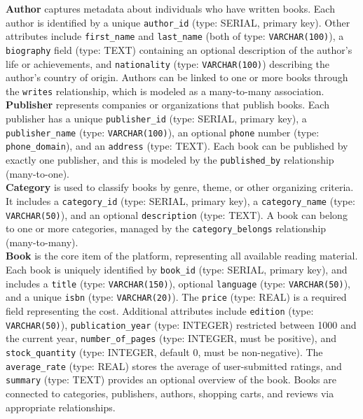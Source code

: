 \textbf{Author} captures metadata about individuals who have written books. Each author is identified by a unique \texttt{author\_id} (type: SERIAL, primary key). Other attributes include \texttt{first\_name} and \texttt{last\_name} (both of type: \texttt{VARCHAR(100)}), a \texttt{biography} field (type: TEXT) containing an optional description of the author's life or achievements, and \texttt{nationality} (type: \texttt{VARCHAR(100)}) describing the author’s country of origin. Authors can be linked to one or more books through the \texttt{writes} relationship, which is modeled as a many-to-many association.\\

\textbf{Publisher} represents companies or organizations that publish books. Each publisher has a unique \texttt{publisher\_id} (type: SERIAL, primary key), a \texttt{publisher\_name} (type: \texttt{VARCHAR(100)}), an optional \texttt{phone} number (type: \texttt{phone\_domain}), and an \texttt{address} (type: TEXT). Each book can be published by exactly one publisher, and this is modeled by the \texttt{published\_by} relationship (many-to-one).\\

\textbf{Category} is used to classify books by genre, theme, or other organizing criteria. It includes a \texttt{category\_id} (type: SERIAL, primary key), a \texttt{category\_name} (type: \texttt{VARCHAR(50)}), and an optional \texttt{description} (type: TEXT). A book can belong to one or more categories, managed by the \texttt{category\_belongs} relationship (many-to-many).\\

\textbf{Book} is the core item of the platform, representing all available reading material. Each book is uniquely identified by \texttt{book\_id} (type: SERIAL, primary key), and includes a \texttt{title} (type: \texttt{VARCHAR(150)}), optional \texttt{language} (type: \texttt{VARCHAR(50)}), and a unique \texttt{isbn} (type: \texttt{VARCHAR(20)}). The \texttt{price} (type: REAL) is a required field representing the cost. Additional attributes include \texttt{edition} (type: \texttt{VARCHAR(50)}), \texttt{publication\_year} (type: INTEGER) restricted between 1000 and the current year, \texttt{number\_of\_pages} (type: INTEGER, must be positive), and \texttt{stock\_quantity} (type: INTEGER, default 0, must be non-negative). The \texttt{average\_rate} (type: REAL) stores the average of user-submitted ratings, and \texttt{summary} (type: TEXT) provides an optional overview of the book. Books are connected to categories, publishers, authors, shopping carts, and reviews via appropriate relationships.\\


